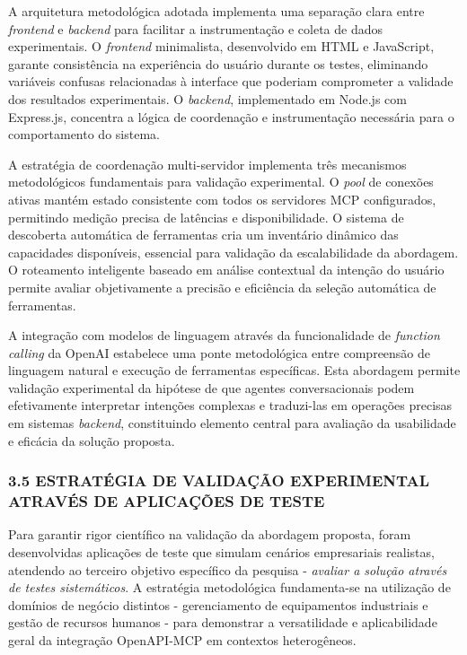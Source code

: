 \documentclass[
]{article}
\begin{document}
A arquitetura metodológica adotada implementa uma separação clara entre
\emph{frontend} e \emph{backend} para facilitar a instrumentação e
coleta de dados experimentais. O \emph{frontend} minimalista,
desenvolvido em HTML e JavaScript, garante consistência na experiência
do usuário durante os testes, eliminando variáveis confusas relacionadas
à interface que poderiam comprometer a validade dos resultados
experimentais. O \emph{backend}, implementado em Node.js com Express.js,
concentra a lógica de coordenação e instrumentação necessária para o
comportamento do sistema.

A estratégia de coordenação multi-servidor implementa três mecanismos
metodológicos fundamentais para validação experimental. O \emph{pool} de
conexões ativas mantém estado consistente com todos os servidores MCP
configurados, permitindo medição precisa de latências e disponibilidade.
O sistema de descoberta automática de ferramentas cria um inventário
dinâmico das capacidades disponíveis, essencial para validação da
escalabilidade da abordagem. O roteamento inteligente baseado em análise
contextual da intenção do usuário permite avaliar objetivamente a
precisão e eficiência da seleção automática de ferramentas.

A integração com modelos de linguagem através da funcionalidade de
\emph{function calling} da OpenAI estabelece uma ponte metodológica
entre compreensão de linguagem natural e execução de ferramentas
específicas. Esta abordagem permite validação experimental da hipótese
de que agentes conversacionais podem efetivamente interpretar intenções
complexas e traduzi-las em operações precisas em sistemas
\emph{backend}, constituindo elemento central para avaliação da
usabilidade e eficácia da solução proposta.

\subsubsection{3.5 ESTRATÉGIA DE VALIDAÇÃO EXPERIMENTAL ATRAVÉS DE
APLICAÇÕES DE
TESTE}\label{estratuxe9gia-de-validauxe7uxe3o-experimental-atravuxe9s-de-aplicauxe7uxf5es-de-teste}

Para garantir rigor científico na validação da abordagem proposta, foram
desenvolvidas aplicações de teste que simulam cenários empresariais
realistas, atendendo ao terceiro objetivo específico da pesquisa -
\emph{avaliar a solução através de testes sistemáticos}. A estratégia
metodológica fundamenta-se na utilização de domínios de negócio
distintos - gerenciamento de equipamentos industriais e gestão de
recursos humanos - para demonstrar a versatilidade e aplicabilidade
geral da integração OpenAPI-MCP em contextos heterogêneos.
\end{document}

